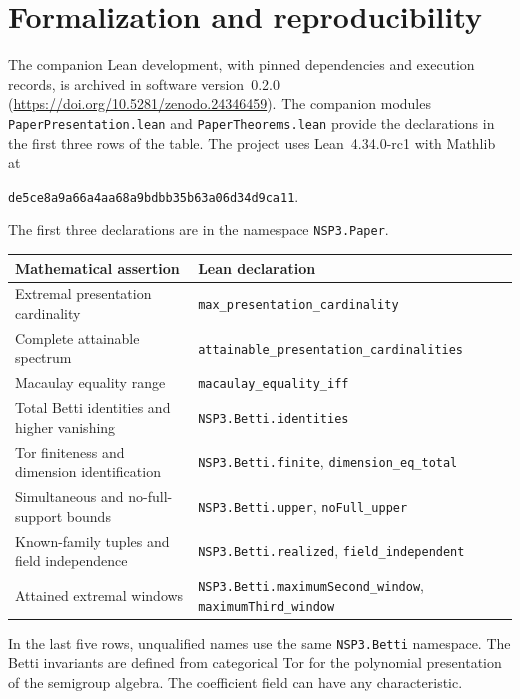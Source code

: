 \documentclass[11pt]{article}
\theoremstyle{definition}
\theoremstyle{remark}
\theoremstyle{plain}
\begin{document}
\section*{Formalization and reproducibility}
The companion Lean development, with pinned dependencies and execution
records, is archived in software version~0.2.0
(\url{https://doi.org/10.5281/zenodo.24346459}). The companion modules \texttt{PaperPresentation.lean} and
\texttt{PaperTheorems.lean} provide the declarations in the first
three rows of the table. The project uses Lean~4.34.0-rc1 with Mathlib at
\begin{center}\small
\texttt{de5ce8a9a66a4aa68a9bdbb35b63a06d34d9ca11}.
\end{center}

The first three declarations are in the namespace \texttt{NSP3.Paper}.

\begin{center}\small
\begin{tabular}{@{}>{\raggedright\arraybackslash}p{.41\linewidth}>{\raggedright\arraybackslash}p{.53\linewidth}@{}}\toprule
Mathematical assertion&Lean declaration\\\midrule
Extremal presentation cardinality&\texttt{max\_presentation\_cardinality}\\
Complete attainable spectrum&\texttt{attainable\_presentation\_cardinalities}\\
Macaulay equality range&\texttt{macaulay\_equality\_iff}\\
Total Betti identities and higher vanishing&\texttt{NSP3.Betti.identities}\\
Tor finiteness and dimension identification&\texttt{NSP3.Betti.finite}, \texttt{dimension\_eq\_total}\\
Simultaneous and no-full-support bounds&\texttt{NSP3.Betti.upper}, \texttt{noFull\_upper}\\
Known-family tuples and field independence&\texttt{NSP3.Betti.realized}, \texttt{field\_independent}\\
Attained extremal windows&\texttt{NSP3.Betti.maximumSecond\_window}, \texttt{maximumThird\_window}\\\bottomrule
\end{tabular}
\end{center}
In the last five rows, unqualified names use the same
\texttt{NSP3.Betti} namespace. The Betti invariants are defined from
categorical Tor for the polynomial presentation of the semigroup
algebra. The coefficient field can have any characteristic.
\end{document}
